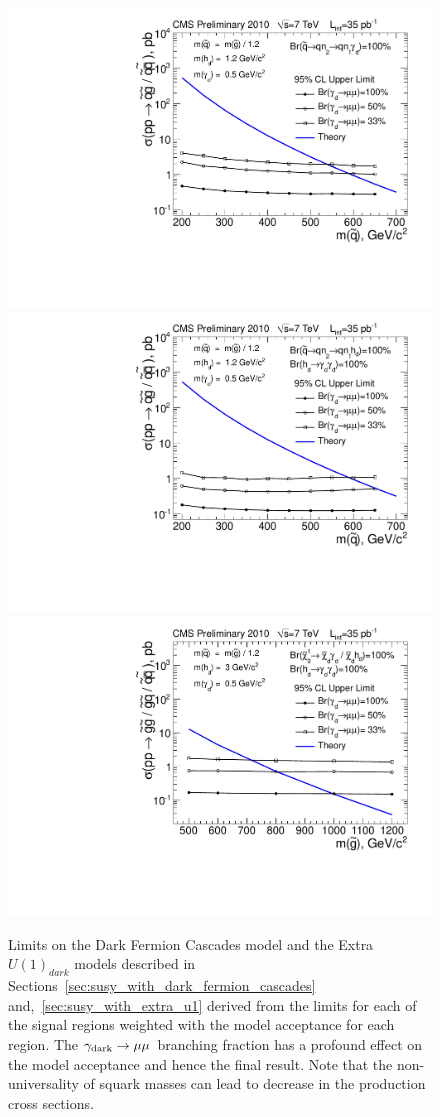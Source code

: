 \begin{figure}
\begin{center}
\includegraphics[width=0.45\linewidth]{PLOTS/ulimit_model0.pdf} \hfill
\includegraphics[width=0.45\linewidth]{PLOTS/ulimit_model1.pdf}
\includegraphics[width=0.45\linewidth]{PLOTS/ulimit_model_u1.pdf}
\end{center}
\caption{Limits on the Dark Fermion Cascades model and the Extra $U(1)_{dark}$ models described in Sections~\ref{sec:susy_with_dark_fermion_cascades}
and,~\ref{sec:susy_with_extra_u1} derived from the limits for each of the signal regions weighted with the model acceptance for each region.  
The $\gamma_{\mbox{\scriptsize dark}} \to \mu\mu$ branching fraction has a profound effect on the model acceptance and hence the final result. 
Note that the non-universality of squark masses can lead to decrease in the production cross sections. \label{fig:ulimit}}
\end{figure}

